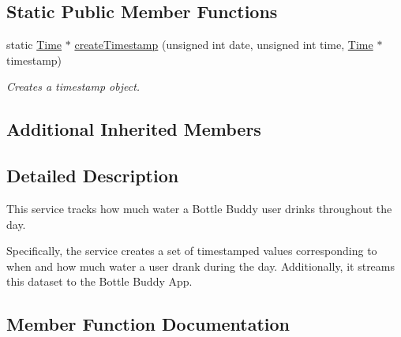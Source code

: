 \subsection*{Static Public Member Functions}
\begin{DoxyCompactItemize}
\item 
static \hyperlink{struct_bottle_buddy_1_1_embedded_1_1_pipeline_1_1_services_1_1_time}{Time} $\ast$ \hyperlink{class_bottle_buddy_1_1_embedded_1_1_pipeline_1_1_services_1_1_water_intake_service_a8a757c8863ea08320b3c894252138deb}{create\+Timestamp} (unsigned int date, unsigned int time, \hyperlink{struct_bottle_buddy_1_1_embedded_1_1_pipeline_1_1_services_1_1_time}{Time} $\ast$timestamp)
\begin{DoxyCompactList}\small\item\em Creates a timestamp object. \end{DoxyCompactList}\end{DoxyCompactItemize}
\subsection*{Additional Inherited Members}


\subsection{Detailed Description}
This service tracks how much water a Bottle Buddy user drinks throughout the day. 

Specifically, the service creates a set of timestamped values corresponding to when and how much water a user drank during the day. Additionally, it streams this dataset to the Bottle Buddy App. 

\subsection{Member Function Documentation}
